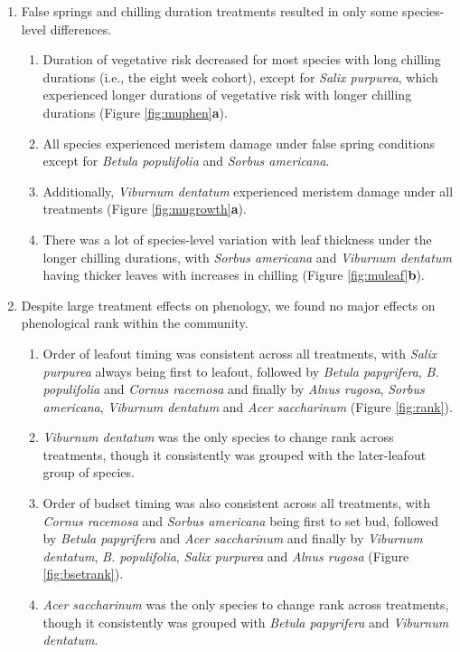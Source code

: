 \documentclass{article}\usepackage[]{graphicx}\usepackage[]{color}
\begin{document}
\begin{enumerate}
  
\item False springs and chilling duration treatments resulted in only some species-level differences.
 \begin{enumerate}
  \item Duration of vegetative risk decreased for most species with long chilling durations (i.e., the eight week cohort), except for \textit{Salix purpurea}, which experienced longer durations of vegetative risk with longer chilling durations (Figure \ref{fig:muphen}\textbf{a}). 
  \item All species experienced meristem damage under false spring conditions except for \textit{Betula populifolia} and \textit{Sorbus americana}.
  \item Additionally, \textit{Viburnum dentatum} experienced meristem damage under all treatments (Figure \ref{fig:mugrowth}\textbf{a}). 
  \item There was a lot of species-level variation with leaf thickness under the longer chilling durations, with \textit{Sorbus americana} and \textit{Viburnum dentatum} having thicker leaves with increases in chilling (Figure \ref{fig:muleaf}\textbf{b}). 
  \end{enumerate}
  
\item Despite large treatment effects on phenology, we found no major effects on phenological rank within the community.
  \begin{enumerate}
  \item Order of leafout timing was consistent across all treatments, with \textit{Salix purpurea} always being first to leafout, followed by \textit{Betula papyrifera}, \textit{B. populifolia} and \textit{Cornus racemosa} and finally by \textit{Alnus rugosa}, \textit{Sorbus americana}, \textit{Viburnum dentatum} and \textit{Acer saccharinum} (Figure \ref{fig:rank}).
  \item \textit{Viburnum dentatum} was the only species to change rank across treatments, though it consistently was grouped with the later-leafout group of species.
  \item Order of budset timing was also consistent across all treatments, with \textit{Cornus racemosa} and \textit{Sorbus americana} being first to set bud, followed by \textit{Betula papyrifera} and \textit{Acer saccharinum} and finally by \textit{Viburnum dentatum}, \textit{B. populifolia}, \textit{Salix purpurea} and \textit{Alnus rugosa} (Figure \ref{fig:bsetrank}).
  \item \textit{Acer saccharinum} was the only species to change rank across treatments, though it consistently was grouped with \textit{Betula papyrifera} and \textit{Viburnum dentatum}.
  \end{enumerate}
\end{enumerate}
\end{document}
